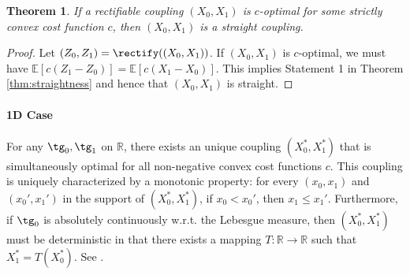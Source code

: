 \documentclass[11pt]{article}
\newtheorem{thm}{Theorem}[section]
\newcommand{\E}{\mathbb{E}}
\newcommand{\RR}{\mathbb{R}}
\begin{document}
\begin{thm}\label{thm:straightOpt}
If a rectifiable  coupling $(X_0,X_1)$ 
is $c$-optimal for some strictly convex cost function $c$, then $(X_0,X_1)$ is a straight coupling. 
\end{thm}
\begin{proof}
Let $(Z_0,Z_1) = \rectify((X_0,X_1))$. 
If $(X_0,X_1)$ is $c$-optimal, we must have $\E[c(Z_1-Z_0)] = \E[c(X_1-X_0)]$. 
This implies Statement 1 in Theorem \ref{thm:straightness} and hence that $(X_0,X_1)$ is straight. 
\end{proof}


\paragraph{1D Case}  
For any $\tg_0,\tg_1$ on $\RR$, there exists an unique coupling $(X_0^*,X_1^*)$
that is simultaneously optimal for all non-negative convex cost functions $c$. This coupling is uniquely characterized by a monotonic property: for every $(x_0,x_1)$ and $(x_0',x_1')$  in the support of $(X_0^*, X_1^*)$, 
if  $x_0< x_0'$, then $x_1 \leq x_1'$. 
Furthermore, if $\tg_0$ is absolutely continuously w.r.t. the Lebesgue measure, 
then $(X_0^*, X_1^*)$ must be deterministic in that there exists a mapping $T\colon \RR\to\RR$ such that $X_1^* = T(X_0^*)$. 
See \cite{santambrogio2015optimal}.   
\end{document}
